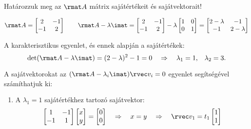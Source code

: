 \documentclass[a4paper, 12pt]{scrartcl}
\begin{document}
\begin{example}
  Határozzuk meg az $\rmat A$ mátrix sajátértékeit és sajátvektorait!

  $$
    \rmat A = \begin{bmatrix}
      2  & -1 \\
      -1 & 2
    \end{bmatrix}
    \qquad
    \rmat A - \lambda \imat = \begin{bmatrix}
      2  & -1 \\
      -1 & 2
    \end{bmatrix} - \lambda \begin{bmatrix}
      1 & 0 \\
      0 & 1
    \end{bmatrix} = \begin{bmatrix}
      2 - \lambda & -1          \\
      -1          & 2 - \lambda
    \end{bmatrix}
  $$

  A karakterisztikus egyenlet, és ennek alapján a sajátértékek:
  $$
    \det(\rmat A - \lambda \imat) = (2 - \lambda)^2 - 1 = 0
    \quad \Rightarrow \quad
    \lambda_1 = 1 \text, \quad \lambda_2 = 3 \text.
  $$

  A sajátvektorokat az $(\rmat A - \lambda_i \imat) \rvec v_i = 0$
  egyenlet segítségével számíthatjuk ki:

  \begin{enumerate}
    \item A $\lambda_1 = 1$ sajátértékhez tartozó sajátvektor:
          $$
            \begin{bmatrix}
              1  & -1 \\
              -1 & 1
            \end{bmatrix} \begin{bmatrix}
              x \\
              y
            \end{bmatrix} = \begin{bmatrix}
              0 \\
              0
            \end{bmatrix}
            \quad \Rightarrow \quad
            x = y
            \quad \Rightarrow \quad
            \rvec v_1 = t_1 \begin{bmatrix}
              1 \\
              1
            \end{bmatrix}
          $$


\end{enumerate}
\end{example}
\end{document}
